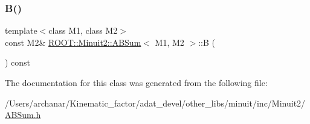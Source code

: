 \mbox{\label{classROOT_1_1Minuit2_1_1ABSum_a6370bd6e7593778d1933ef761dad2449}} 
\subsubsection{\texorpdfstring{B()}{B()}\hspace{0.1cm}{\footnotesize\ttfamily [2/2]}}
{\footnotesize\ttfamily template$<$class M1, class M2$>$ \\
const M2\& \mbox{\hyperlink{classROOT_1_1Minuit2_1_1ABSum}{R\+O\+O\+T\+::\+Minuit2\+::\+A\+B\+Sum}}$<$ M1, M2 $>$\+::B (\begin{DoxyParamCaption}{ }\end{DoxyParamCaption}) const\hspace{0.3cm}{\ttfamily [inline]}}



The documentation for this class was generated from the following file\+:\begin{DoxyCompactItemize}
\item 
/\+Users/archanar/\+Kinematic\+\_\+factor/adat\+\_\+devel/other\+\_\+libs/minuit/inc/\+Minuit2/\mbox{\hyperlink{other__libs_2minuit_2inc_2Minuit2_2ABSum_8h}{A\+B\+Sum.\+h}}\end{DoxyCompactItemize}
